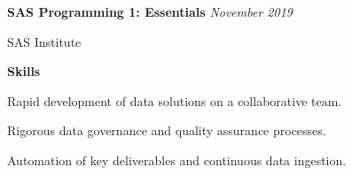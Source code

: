 \documentclass[12pt]{article}
\begin{document}
\vspace{.25em}
\textbf{SAS Programming 1: Essentials} \hfill \textit{November 2019}
\par SAS Institute



\vspace{.75em}
\textbf{\Large Skills} \hrulefill
\vspace{.5em}

Rapid development of data solutions on a collaborative team.

\vspace{.25em}
Rigorous data governance and quality assurance processes.

\vspace{.25em}
Automation of key deliverables and continuous data ingestion.
\end{document}
